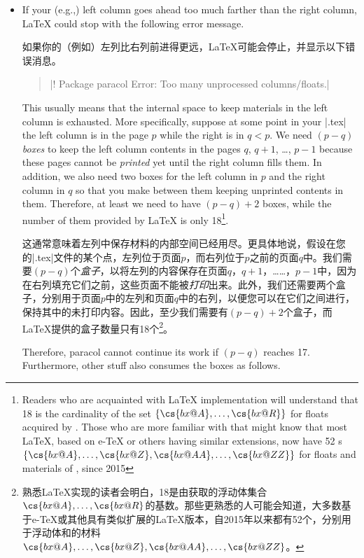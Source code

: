  \begin{itemize}
 \item
 If your (e.g.,) left column goes ahead too much farther than the right
 column, \LaTeX{} could stop with the following error message.

 如果你的（例如）左列比右列前进得更远，\LaTeX{}可能会停止，并显示以下错误消息。
 \begin{quote}
 |! Package paracol Error: Too many unprocessed columns/floats.|
 \end{quote}

 This usually means that the internal space to keep materials in the left
 column is exhausted.  More specifically, suppose at some point in your
 |.tex| the left column is in the page $p$ while the right is in $q<p$.
 We need $(p-q)$ \emph{boxes} to keep the left column contents in the pages
 $q$, $q+1$, \ldots, $p-1$ because these pages cannot be \emph{printed} yet
 until the right column fills them.  In addition, we also need two boxes
 for the left column in $p$ and the right column in $q$ so that you make
 \cswitch{} between them keeping unprinted contents in them.  Therefore, at
 least we need to have $(p-q)+2$ boxes, while the number of them provided
 by \LaTeX{} is only 18\footnote{%
 Readers who are acquainted with \LaTeX{} implementation will understand
 that 18 is the cardinality of the set $\{\cs{bx@A},\ldots,\cs{bx@R}\}$ for
 floats acquired by .  Those who are more familiar with that
 might know that most \LaTeX{}, based on e-\TeX{} or others having similar
 extensions, now have 52 s
 $\{\cs{bx@A},\ldots,\cs{bx@Z},\cs{bx@AA},\ldots,\cs{bx@ZZ}\}$ for floats
 and materials of \Paracol, since 2015}.

这通常意味着左列中保存材料的内部空间已经用尽。更具体地说，假设在您的|.tex|文件的某个点，左列位于页面$p$，而右列位于$p$之前的页面$q$中。我们需要$(p-q)$个\emph{盒子}，以将左列的内容保存在页面$q$，$q+1$，……，$p-1$中，因为在右列填充它们之前，这些页面不能被\emph{打印}出来。此外，我们还需要两个盒子，分别用于页面$p$中的左列和页面$q$中的右列，以便您可以在它们之间进行\cswitch{}，保持其中的未打印内容。因此，至少我们需要有$(p-q)+2$个盒子，而\LaTeX{}提供的盒子数量只有18个\footnote{熟悉\LaTeX{}实现的读者会明白，18是由获取的浮动体集合${\cs{bx@A},\ldots,\cs{bx@R}}$的基数。那些更熟悉的人可能会知道，大多数基于e-\TeX{}或其他具有类似扩展的\LaTeX{}版本，自2015年以来都有52个，分别用于浮动体和\Paracol{}的材料${\cs{bx@A},\ldots,\cs{bx@Z},\cs{bx@AA},\ldots,\cs{bx@ZZ}}$。}。

 Therefore, \textsf{paracol} cannot continue its work if $(p-q)$ reaches
 17.  Furthermore, other stuff also consumes the boxes as follows.


\end{itemize}
